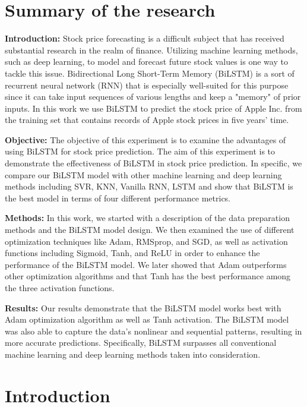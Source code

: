 \documentclass[a4paper]{article}
\begin{document}
\pagebreak

\section{Summary of the research}
\textbf{Introduction:} Stock price forecasting is a difficult subject that has received substantial research in the realm of finance. Utilizing machine learning methods, such as deep learning, to model and forecast future stock values is one way to tackle this issue. Bidirectional Long Short-Term Memory (BiLSTM) is a sort of recurrent neural network (RNN) that is especially well-suited for this purpose since it can take input sequences of various lengths and keep a "memory" of prior inputs.  In this work we use BiLSTM to predict the stock price of Apple Inc. from the training set that contains records of Apple stock prices in five years' time.

\textbf{Objective:} The objective of this experiment is to examine the advantages of using BiLSTM for stock price prediction. The aim of this experiment is to demonstrate the effectiveness of BiLSTM in stock price prediction. In specific, we compare our BiLSTM model with other machine learning and deep learning methods including SVR, KNN, Vanilla RNN, LSTM and show that BiLSTM is the best model in terms of four different performance metrics. 

\textbf{Methods:} In this work, we started with a description of the data preparation methods and the BiLSTM model design. We then examined the use of different optimization techniques like Adam, RMSprop, and SGD, as well as activation functions including Sigmoid, Tanh, and ReLU in order to enhance the performance of the BiLSTM model. We later showed that Adam outperforms other optimization algorithms and that Tanh has the best performance among the three activation functions.

\textbf{Results:} Our results demonstrate that the BiLSTM model works best with Adam optimization algorithm as well as Tanh activation. The BiLSTM model was also able to capture the data's nonlinear and sequential patterns, resulting in more accurate predictions. Specifically, BiLSTM surpasses all conventional machine learning and deep learning methods taken into consideration.
\vfill
\pagebreak
\section{Introduction}
\end{document}
